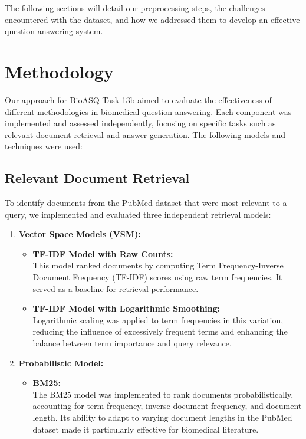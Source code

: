 \documentclass{article}
\begin{document}
The following sections will detail our preprocessing steps, the challenges encountered with the dataset, and how we addressed them to develop an effective question-answering system.


\section{Methodology}
Our approach for BioASQ Task-13b aimed to evaluate the effectiveness of different methodologies in biomedical question answering. Each component was implemented and assessed independently, focusing on specific tasks such as relevant document retrieval and answer generation. The following models and techniques were used:

\subsection{Relevant Document Retrieval}
To identify documents from the PubMed dataset that were most relevant to a query, we implemented and evaluated three independent retrieval models:

\begin{enumerate}
    \item \textbf{Vector Space Models (VSM):}
        \begin{itemize}
            \item \textbf{TF-IDF Model with Raw Counts:}\\
            This model ranked documents by computing Term Frequency-Inverse Document Frequency (TF-IDF) scores using raw term frequencies. It served as a baseline for retrieval performance.
            \item \textbf{TF-IDF Model with Logarithmic Smoothing:}\\
            Logarithmic scaling was applied to term frequencies in this variation, reducing the influence of excessively frequent terms and enhancing the balance between term importance and query relevance.
        \end{itemize}
    \item \textbf{Probabilistic Model:}
        \begin{itemize}
            \item \textbf{BM25:}\\
            The BM25 model was implemented to rank documents probabilistically, accounting for term frequency, inverse document frequency, and document length. Its ability to adapt to varying document lengths in the PubMed dataset made it particularly effective for biomedical literature.
        \end{itemize}
\end{enumerate}
\end{document}

